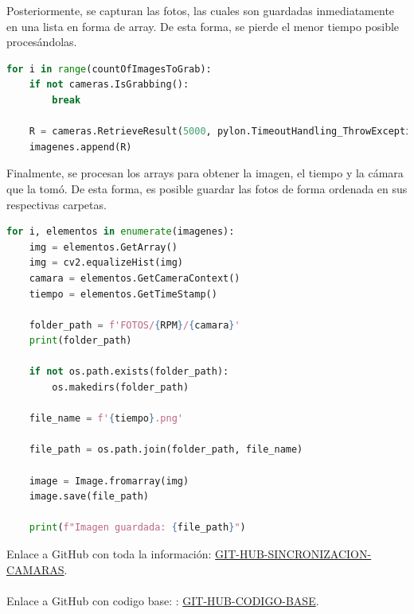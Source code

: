 \documentclass{article}
\begin{document}
\noindent Posteriormente, se capturan las fotos, las cuales son guardadas inmediatamente en una lista en forma de array. De esta forma, se pierde el menor tiempo posible procesándolas.

\begin{lstlisting}[language=Python]
  for i in range(countOfImagesToGrab):
    if not cameras.IsGrabbing():
        break

    R = cameras.RetrieveResult(5000, pylon.TimeoutHandling_ThrowException)
    imagenes.append(R)
\end{lstlisting}

\noindent Finalmente, se procesan los arrays para obtener la imagen, el tiempo y la cámara que la tomó. De esta forma, es posible guardar las fotos de forma ordenada en sus respectivas carpetas.

\begin{lstlisting}[language=Python]
  for i, elementos in enumerate(imagenes):
    img = elementos.GetArray()
    img = cv2.equalizeHist(img)
    camara = elementos.GetCameraContext()
    tiempo = elementos.GetTimeStamp()

    folder_path = f'FOTOS/{RPM}/{camara}'
    print(folder_path)

    if not os.path.exists(folder_path):
        os.makedirs(folder_path)

    file_name = f'{tiempo}.png'

    file_path = os.path.join(folder_path, file_name)

    image = Image.fromarray(img)
    image.save(file_path)

    print(f"Imagen guardada: {file_path}")
\end{lstlisting}

\noindent Enlace a GitHub con toda la información: \href{https://github.com/LukasWolff2002/SINCRONIZACION_CAMARAS_BASLER}{GIT-HUB-SINCRONIZACION-CAMARAS}.
\\ \\
\noindent Enlace a GitHub con codigo base: : \href{https://github.com/basler/pypylon/blob/master/samples/grabmultiplecameras.py}{GIT-HUB-CODIGO-BASE}.
\end{document}
